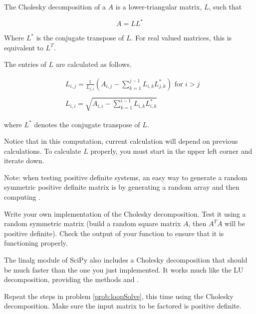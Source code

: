 The Cholesky decomposition of a $A$ is a lower-triangular matrix, $L$, such that

\begin{equation*}
 A = LL^*
\end{equation*}

Where $L^*$ is the conjugate transpose of $L$.
For real valued matrices, this is equivalent to $L^T$.

The entries of $L$ are calculated as follows.

\begin{align*}
&L_{i,j} = \frac{1}{L_{j,j}}\left(A_{i,j} -\sum_{k=1}^{j-1}{L_{i,k}L_{j,k}^*}\right) \mbox{ for $i>j$} \\ \\
&L_{i,i} = \sqrt{A_{i,i} - \sum_{k=1}^{i-1}{L_{i,k}L_{i,k}^*}}
\end{align*}

where $L^*$ denotes the conjugate transpose of $L$.

Notice that in this computation, current calculation will depend on previous calculations. To calculate $L$ properly, you must start in the upper left corner and iterate down.

Note: when testing positive definite systems, an easy way to generate a random symmetric positive definite matrix is by generating a random array  and then computing .

\begin{problem}
Write your own implementation of the Cholesky decomposition.
Test it using a random symmetric matrix (build a random square matrix $A$, then $A^TA$ will be positive definite).
Check the output of your function to ensure that it is functioning properly.
\end{problem}


The linalg module of SciPy also includes a Cholesky decomposition that should be much faster than the one you just implemented. It works much like the LU decomposition, providing the methods  and .

\begin{problem}
Repeat the steps in problem \ref{prob:loopSolve}, this time using the
Cholesky decomposition. Make sure the input matrix to be factored is
positive definite.
\end{problem} 

